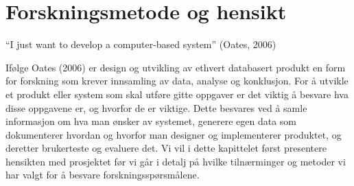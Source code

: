 \chapter{Forskningsmetode og hensikt}
\label{chp:forskningsmetode}

“I just want to develop a computer-based system” (Oates, 2006)

Ifølge Oates (2006) er design og utvikling av ethvert databasert produkt en form for forskning som krever innsamling av data, analyse og konklusjon. For å utvikle et produkt eller system som skal utføre gitte oppgaver er det viktig å besvare hva disse oppgavene er, og hvorfor de er viktige. Dette besvares ved å samle informasjon om hva man ønsker av systemet, generere egen data som dokumenterer hvordan og hvorfor man designer og implementerer produktet, og deretter brukerteste og evaluere det. Vi vil i dette kapittelet først presentere hensikten med prosjektet før vi går i detalj på hvilke tilnærminger og metoder vi har valgt for å besvare forskningsspørsmålene.

